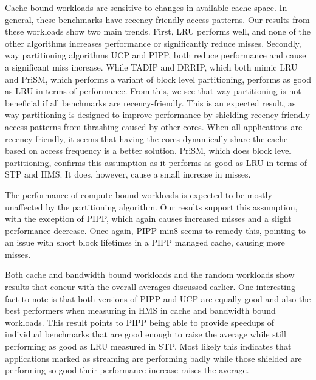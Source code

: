 Cache bound workloads are sensitive to changes in available cache space.
In general, these benchmarks have recency-friendly access patterns.
Our results from these workloads show two main trends.
First, LRU performs well, and none of the other algorithms increases performance or significantly reduce misses.
Secondly, way partitioning algorithms UCP and PIPP, both reduce performance and cause a significant miss increase. 
While TADIP and DRRIP, which both mimic LRU and PriSM, which performs a variant of block level partitioning, performs as good as LRU in terms of performance.
From this, we see that way partitioning is not beneficial if all benchmarks are recency-friendly.
This is an expected result, as way-partitioning is designed to improve performance by shielding recency-friendly access patterns from thrashing caused by other cores.
When all applications are recency-friendly, it seems that having the cores dynamically share the cache based on access frequency is a better solution.
PriSM, which does block level partitioning, confirms this assumption as it performs as good as LRU in terms of STP and HMS.
It does, however, cause a small increase in misses.

The performance of compute-bound workloads is expected to be mostly unaffected by the partitioning algorithm. 
Our results support this assumption, with the exception of PIPP, which again causes increased misses and a slight performance decrease.
Once again, PIPP-min8 seems to remedy this, pointing to an issue with short block lifetimes in a PIPP managed cache, causing more misses.

Both cache and bandwidth bound workloads and the random workloads show results that concur with the overall averages discussed earlier.
One interesting fact to note is that both versions of PIPP and UCP are equally good and also the best performers when measuring in HMS in cache and bandwidth bound workloads.
This result points to PIPP being able to provide speedups of individual benchmarks that are good enough to raise the average while still performing as good as LRU measured in STP.
Most likely this indicates that applications marked as streaming are performing badly while those shielded are performing so good their performance increase raises the average.


